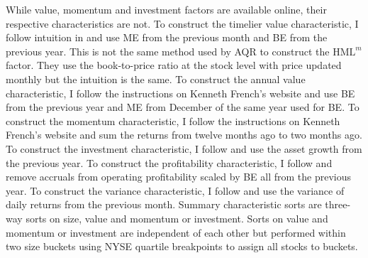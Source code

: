 While value, momentum and investment factors are available online, their
respective characteristics are not.
To construct the timelier value characteristic,
I follow intuition in \textcite{asness2013devil}
and use ME from the previous month and BE from the previous year.
This is not the same method used by AQR to construct the $\text{HML}^m$ factor.
They use the book-to-price ratio at the stock level with price updated monthly
but the intuition is the same.
To construct the annual value characteristic,
I follow the instructions on Kenneth French's website and use BE from the
previous year and ME from December of the same year used for BE.
To construct the momentum characteristic, I follow the instructions on Kenneth
French’s website and sum the returns from twelve months ago to two months ago.
To construct the investment characteristic,
I follow \textcite{fama2015five} and use the asset growth from the previous
year.
To construct the profitability characteristic, I follow
\textcite{ball2016accruals} and remove accruals from operating profitability
scaled by BE all from the previous year.
To construct the variance characteristic, I follow
\textcite{moreira2017volatility} and use the variance of daily returns from the
previous month.
Summary characteristic sorts are three-way sorts on size, value and momentum or
investment.
Sorts on value and momentum or investment are independent of each other but
performed within two size buckets using NYSE quartile breakpoints to assign all
stocks to buckets.
